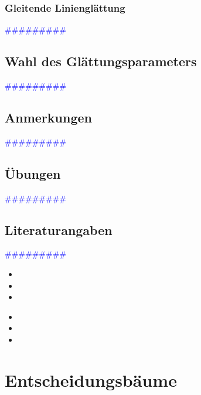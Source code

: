 \documentclass{article}
\begin{document}
    \subsubsection{Gleitende Linienglättung} %
       \textcolor{blue}{\#\#\#\#\#\#\#\#\#}
  \subsection{Wahl des Glättungsparameters} %
       \textcolor{blue}{\#\#\#\#\#\#\#\#\#}
  \subsection{Anmerkungen} %
       \textcolor{blue}{\#\#\#\#\#\#\#\#\#}
  \subsection{Übungen} %
       \textcolor{blue}{\#\#\#\#\#\#\#\#\#}
  \subsection{Literaturangaben} %
      \textcolor{blue}{\#\#\#\#\#\#\#\#\#}

      \begin{itemize}
      \color{red}
        \item 
        \item
        \item
      \end{itemize}


      \begin{itemize}
      \color{ForestGreen}
        \item 
        \item
        \item
      \end{itemize}




\newpage
\section{Entscheidungsbäume} %
\end{document}
